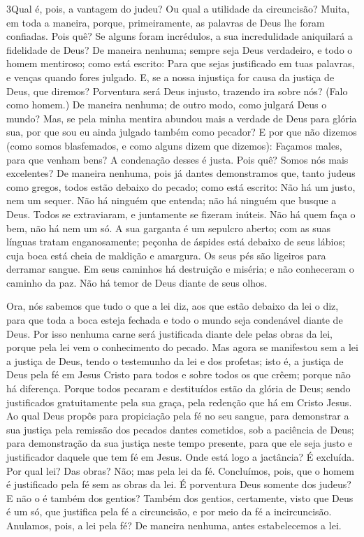 \medskip

\lettrine{3} Qual é, pois, a vantagem do judeu? Ou qual a
utilidade da circuncisão? Muita, em toda a maneira, porque,
primeiramente, as palavras de Deus lhe foram confiadas. Pois
quê? Se alguns foram incrédulos, a sua incredulidade aniquilará a
fidelidade de Deus? De maneira nenhuma; sempre seja Deus
verdadeiro, e todo o homem mentiroso; como está escrito: Para que
sejas justificado em tuas palavras, e venças quando fores julgado.
E, se a nossa injustiça for causa da justiça de Deus, que
diremos? Porventura será Deus injusto, trazendo ira sobre nós? (Falo
como homem.) De maneira nenhuma; de outro modo, como julgará
Deus o mundo? Mas, se pela minha mentira abundou mais a verdade
de Deus para glória sua, por que sou eu ainda julgado também como
pecador? E por que não dizemos (como somos blasfemados, e como
alguns dizem que dizemos): Façamos males, para que venham bens? A
condenação desses é justa. Pois quê? Somos nós mais excelentes?
De maneira nenhuma, pois já dantes demonstramos que, tanto judeus
como gregos, todos estão debaixo do pecado; como está
escrito: Não há um justo, nem um sequer. Não há ninguém que
entenda; não há ninguém que busque a Deus. Todos se
extraviaram, e juntamente se fizeram inúteis. Não há quem faça o
bem, não há nem um só. A sua garganta é um sepulcro aberto;
com as suas línguas tratam enganosamente; peçonha de áspides está
debaixo de seus lábios; cuja boca está cheia de maldição e
amargura. Os seus pés são ligeiros para derramar sangue.
Em seus caminhos há destruição e miséria; e não
conheceram o caminho da paz. Não há temor de Deus diante de
seus olhos.

Ora, nós sabemos que tudo o que a lei diz, aos que estão debaixo
da lei o diz, para que toda a boca esteja fechada e todo o mundo
seja condenável diante de Deus. Por isso nenhuma carne será
justificada diante dele pelas obras da lei, porque pela lei vem o
conhecimento do pecado. Mas agora se manifestou sem a lei a
justiça de Deus, tendo o testemunho da lei e dos profetas;
isto é, a justiça de Deus pela fé em Jesus Cristo para todos
e sobre todos os que crêem; porque não há diferença. Porque
todos pecaram e destituídos estão da glória de Deus; sendo
justificados gratuitamente pela sua graça, pela redenção que há em
Cristo Jesus. Ao qual Deus propôs para propiciação pela fé no
seu sangue, para demonstrar a sua justiça pela remissão dos pecados
dantes cometidos, sob a paciência de Deus; para demonstração
da sua justiça neste tempo presente, para que ele seja justo e
justificador daquele que tem fé em Jesus. Onde está logo a
jactância? É excluída. Por qual lei? Das obras? Não; mas pela lei da
fé. Concluímos, pois, que o homem é justificado pela fé sem
as obras da lei. É porventura Deus somente dos judeus? E não
o é também dos gentios? Também dos gentios, certamente, visto
que Deus é um só, que justifica pela fé a circuncisão, e por meio da
fé a incircuncisão. Anulamos, pois, a lei pela fé? De maneira
nenhuma, antes estabelecemos a lei.

